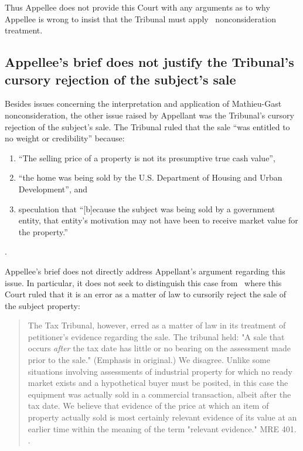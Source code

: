 \documentclass[12pt,\documentclassflag]{michiganCourtOfAppealsBrief}
\begin{document}
Thus Appellee does not provide this Court with any arguments as to why Appellee is wrong to insist that the Tribunal must apply \mathieuGast\ nonconsideration treatment.

\subsection{Appellee's brief does not justify the Tribunal's cursory rejection of the subject's sale}

Besides issues concerning the interpretation and application of Mathieu-Gast nonconsideration, the other issue raised by Appellant was the Tribunal's cursory rejection of the subject's sale. The Tribunal ruled that the sale ``was entitled to no weight or credibility'' because:

\begin{enumerate}
\item ``The selling price of a property is not its presumptive true cash value'',
\item ``the home was being sold by the U.S. Department of Housing and Urban Development'', and
\item speculation that ``[b]ecause the subject was being sold by a government entity, that entity's motivation may not have been to receive market value for the property.''
\end{enumerate}
\reconsiderationDenied[2].

Appellee's brief does not directly address Appellant's argument regarding this issue. In particular, it does not seek to distinguish this case from \cite{Jones & Laughlin}\ where this Court ruled that it is an error as a matter of law to cursorily reject the sale of the subject property:

\begin{quote}
  The Tax Tribunal, however, erred as a matter of law in its treatment of petitioner's evidence regarding the sale. The tribunal held: "A sale that occurs {\em after} the tax date has little or no bearing on the assessment made prior to the sale." (Emphasis in original.) We disagree. Unlike some situations involving assessments of industrial property for which no ready market exists and a hypothetical buyer must be posited, in this case the equipment was actually sold in a commercial transaction, albeit after the tax date. We believe that evidence of the price at which an item of property actually sold is most certainly relevant evidence of its value at an earlier time within the meaning of the term "relevant evidence." MRE 401. .
\end{quote}
\end{document}
